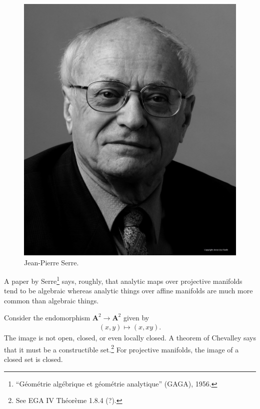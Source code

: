 \documentclass [11 pt, oneside, margin = 1 in] {article}
\begin{document}
\begin{figure}
\begin{center}
\includegraphics[scale=0.8]{images/serre}
\caption{Jean-Pierre Serre.}
\end{center}
\end{figure}

\begin{remark}
	A paper by Serre\footnote{``G\'eom\'etrie alg\'ebrique et g\'eom\'etrie analytique'' (GAGA), 1956.} says, roughly, that analytic maps over projective manifolds tend to be algebraic whereas analytic things over affine manifolds are much more common than algebraic things.
\end{remark}


\begin{example}\label{}\text{}
Consider the endomorphism $\mathbf{A}^2\longrightarrow \mathbf{A}^2$ given by
\begin{align*}
	(x,y)\longmapsto  (x,xy).
\end{align*}
The image is not open, closed, or even locally closed. A theorem of Chevalley says that it must be a constructible set.\footnote{See EGA IV Th\'eor\`eme 1.8.4 (?).} For projective manifolds, the image of a closed set is closed.
\end{example}
\end{document}
